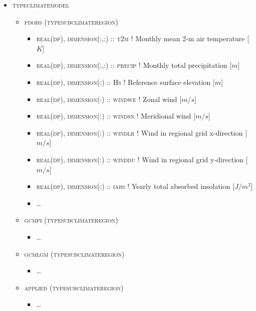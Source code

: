 \documentclass{article}
\begin{document}
\begin{itemize}
\item \textsc{type\textunderscore climate\textunderscore model}
\begin{itemize}

  \item \textsc{pd\textunderscore obs (type\textunderscore subclimate\textunderscore region)}
  \begin{itemize}
    \item \textsc{real(dp), dimension(:,:) :: t2m} ! Monthly mean 2-m air temperature [$K$]
    \item \textsc{real(dp), dimension(:,:) :: precip} ! Monthly total precipitation [$m$]
    \item \textsc{real(dp), dimension(:) :: Hs} ! Reference surface elevation [$m$]
    \item \textsc{real(dp), dimension(:) :: wind\textunderscore we} ! Zonal wind [$m/s$]
    \item \textsc{real(dp), dimension(:) :: wind\textunderscore sn} ! Meridional wind [$m/s$]
    \item \textsc{real(dp), dimension(:) :: wind\textunderscore lr} ! Wind in regional grid x-direction [$m/s$]
    \item \textsc{real(dp), dimension(:) :: wind\textunderscore du} ! Wind in regional grid y-direction [$m/s$]
    \item \textsc{real(dp), dimension(:) :: i\textunderscore abs} ! Yearly total absorbed insolation [$J/m^2$]
    \item \dots
  \end{itemize}
  
  \item \textsc{gcm\textunderscore pi (type\textunderscore subclimate\textunderscore region)}
  \begin{itemize}
    \item \dots
  \end{itemize}
  
  \item \textsc{gcm\textunderscore lgm (type\textunderscore subclimate\textunderscore region)}
  \begin{itemize}
    \item \dots
  \end{itemize}
  
  \item \textsc{applied (type\textunderscore subclimate\textunderscore region)}
  \begin{itemize}
    \item \dots
  \end{itemize}
  
\end{itemize}
\end{itemize}
\end{document}
